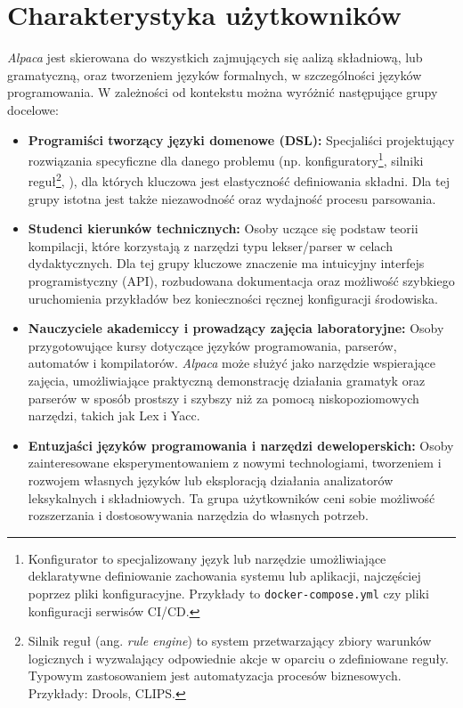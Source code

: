 \section{Charakterystyka użytkowników}
\label{sec:charakterystyka-uzytkownikow}

\textit{Alpaca} jest skierowana do wszystkich zajmujących się aalizą składniową, lub gramatyczną, oraz tworzeniem języków formalnych, w szczególności języków programowania.
W zależności od kontekstu można wyróżnić następujące grupy docelowe:

\begin{itemize}
    \item \textbf{Programiści tworzący języki domenowe (DSL):}
    Specjaliści projektujący rozwiązania specyficzne dla danego problemu (np.
    konfiguratory\footnote{Konfigurator to specjalizowany język lub narzędzie umożliwiające deklaratywne definiowanie zachowania systemu lub aplikacji, najczęściej poprzez pliki konfiguracyjne. Przykłady to \texttt{docker-compose.yml} czy pliki konfiguracji serwisów CI/CD.},
    silniki reguł\footnote{Silnik reguł (ang. \textit{rule engine}) to system przetwarzający zbiory warunków logicznych i wyzwalający odpowiednie akcje w oparciu o zdefiniowane reguły. Typowym zastosowaniem jest automatyzacja procesów biznesowych. Przykłady: Drools, CLIPS.},
    ), dla których kluczowa jest elastyczność definiowania składni. Dla tej grupy istotna jest także niezawodność oraz wydajność procesu parsowania.

    \item \textbf{Studenci kierunków technicznych:}
    Osoby uczące się podstaw teorii kompilacji, które korzystają z narzędzi typu lekser/parser w celach dydaktycznych.
    Dla tej grupy kluczowe znaczenie ma intuicyjny interfejs programistyczny (API), rozbudowana dokumentacja oraz możliwość szybkiego uruchomienia przykładów bez konieczności ręcznej konfiguracji środowiska.

    \item \textbf{Nauczyciele akademiccy i prowadzący zajęcia laboratoryjne:}
    Osoby przygotowujące kursy dotyczące języków programowania, parserów, automatów i kompilatorów.
    \textit{Alpaca} może służyć jako narzędzie wspierające zajęcia, umożliwiające praktyczną demonstrację działania gramatyk oraz parserów w sposób prostszy i szybszy niż za pomocą niskopoziomowych narzędzi, takich jak Lex i Yacc.

    \item \textbf{Entuzjaści języków programowania i narzędzi deweloperskich:}
    Osoby zainteresowane eksperymentowaniem z nowymi technologiami, tworzeniem i rozwojem własnych języków lub eksploracją działania analizatorów leksykalnych i składniowych.
    Ta grupa użytkowników ceni sobie możliwość rozszerzania i dostosowywania narzędzia do własnych potrzeb.
\end{itemize}


